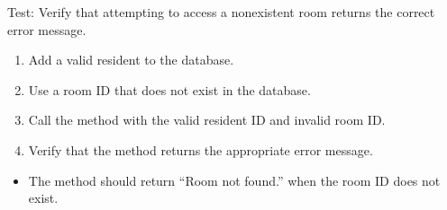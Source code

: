 \documentclass[letterpaper,10pt,english]{sphinxmanual}
\begin{document}
\begin{fulllineitems}
\label{\detokenize{test:test.test_room.test_access_room_room_not_found}}
\pysigstartsignatures
\pysiglinewithargsret
{}
{}
{}
\pysigstopsignatures
\sphinxAtStartPar
Test: Verify that attempting to access a non\sphinxhyphen{}existent room returns the correct error message.
\begin{description}
\begin{enumerate}
%
\item {} 
\sphinxAtStartPar
Add a valid resident to the database.

\item {} 
\sphinxAtStartPar
Use a room ID that does not exist in the database.

\item {} 
\sphinxAtStartPar
Call the  method with the valid resident ID and invalid room ID.

\item {} 
\sphinxAtStartPar
Verify that the method returns the appropriate error message.

\end{enumerate}

\begin{itemize}
\item {} 
\sphinxAtStartPar
The method should return “Room not found.” when the room ID does not exist.

\end{itemize}

\end{description}

\end{fulllineitems}

\end{document}
